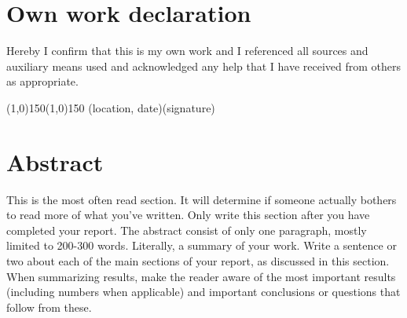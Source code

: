 \cleardoublepage
\section*{Own work declaration}
  Hereby I confirm that this is my own work and I referenced all sources and
  auxiliary means used and acknowledged any help that I have received from
  others as appropriate.

\vspace*{30mm}
\hspace{-6mm}\line(1,0){150}\hspace{44mm}\line(1,0){150}
\newline
(location, date)\hspace{72mm}(signature)

\cleardoublepage
%

\cleardoublepage
\section*{Abstract}
This is the most often read section. It will determine if someone actually bothers to read more
of what you've written. Only write this section after you have completed your
report. The abstract consist of only one paragraph, mostly limited
to 200-300 words. Literally, a summary of your work. Write a sentence
or two about each of the main sections of your report, as discussed in this section. When
summarizing results, make the reader aware of the most important results (including numbers when applicable)
and important conclusions or questions that follow from these.
\newline
\newpage

